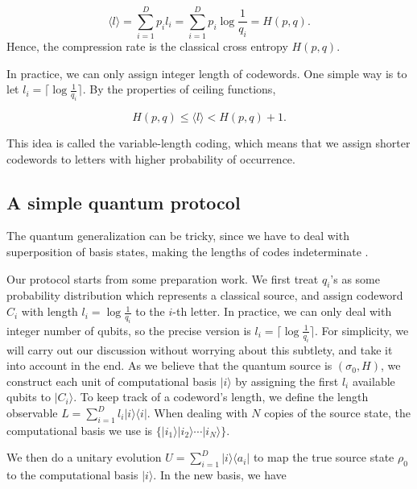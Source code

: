 \documentclass[11pt]{article}
\begin{document}
\begin{equation}
\label{low1}
    \langle l \rangle = \sum_{i=1}^D p_i l_i = \sum_{i=1}^D p_i \log \frac{1}{q_i} = H(p, q).
\end{equation}
Hence, the compression rate is the classical cross entropy $H(p,q)$. 

In practice, we can only assign integer length of codewords. One simple way is to let $l_i = \big\lceil \log \frac{1}{q_i} \big\rceil$. By the properties of ceiling functions,

\begin{equation}
    H(p,q) \leq \langle l \rangle < H(p,q) + 1.
\end{equation}

This idea is called the variable-length coding, which means that we assign shorter codewords to letters with higher probability of occurrence. 

\subsection{A simple quantum protocol}






The quantum generalization can be tricky, since we have to deal with superposition of basis states, making the lengths of codes indeterminate \cite{indeter, qhuffman}. 

Our protocol starts from some preparation work. We first treat $q_i$'s as some probability distribution which represents a classical source, and assign codeword $C_i$ with length $l_i = \log \frac{1}{q_i}$ to the $i$-th letter. In practice, we can only deal with integer number of qubits, so the precise version is $l_i = \big\lceil \log \frac{1}{q_i} \big\rceil$. 
For simplicity, we will carry out our discussion without worrying about this subtlety, and take it into account in the end.
As we believe that the quantum source is $(\sigma_0, H)$, we construct each unit of computational basis $|i\rangle$ by assigning the first $l_i$ available qubits to $|C_i\rangle$. To keep track of a codeword's length, we define the length observable $L= \sum_{i=1}^D l_i |i\rangle \langle i|$. 
When dealing with $N$ copies of the source state, the computational basis we use is $\{|i_1\rangle |i_2\rangle \cdots |i_N\rangle \}$.

We then do a unitary evolution $U = \sum_{i=1}^D |i\rangle \langle a_i|$ to map the true source state $\rho_0$ to the computational basis $|i\rangle$. 
In the new basis, we have
\end{document}
